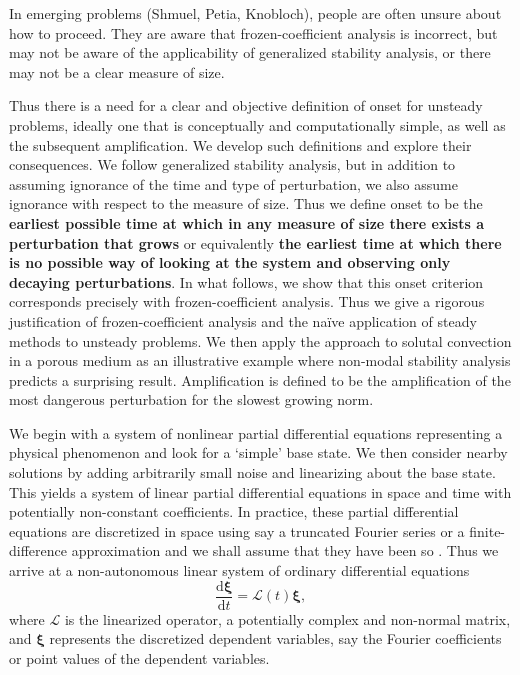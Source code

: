 \documentclass[letterpaper,prl,aps,twocolumn,reprint,superscriptaddress]{revtex4-1}
\newcommand{\cL}{\boldsymbol{\mathcal{L}}}
\newcommand{\prt}{\boldsymbol{\xi}}
\begin{document}
In emerging problems (Shmuel, Petia, Knobloch), people are often unsure about how to proceed.  They are aware that frozen-coefficient analysis is incorrect, but may not be aware of the applicability of generalized stability analysis, or there may not be a clear measure of size.

Thus there is a need for a clear and objective definition of onset for unsteady problems, ideally one that is conceptually and computationally simple, as well as the subsequent amplification.  We develop such definitions and explore their consequences.  We follow generalized stability analysis, but in addition to assuming ignorance of the time and type of perturbation, we also assume ignorance with respect to the measure of size.  Thus we define onset to be the {\bf earliest possible time at which in any measure of size there exists a perturbation that grows} or equivalently {\bf the earliest time at which there is no possible way of looking at the system and observing only decaying perturbations}.  In what follows, we show that this onset criterion corresponds precisely with frozen-coefficient analysis.  Thus we give a rigorous justification of frozen-coefficient analysis and the na\"ive application of steady methods to unsteady problems.  We then apply the approach to solutal convection in a porous medium as an illustrative example where non-modal stability analysis predicts a surprising result.  Amplification is defined to be the amplification of the most dangerous perturbation for the slowest growing norm.

We begin with a system of nonlinear partial differential equations representing a physical phenomenon and look for a `simple' base state.  We then consider nearby solutions by adding arbitrarily small noise and linearizing about the base state.  This yields a system of linear partial differential equations in space and time with potentially non-constant coefficients.  In practice, these partial differential equations are discretized in space using say a truncated Fourier series or a finite-difference approximation and we shall assume that they have been so \cite{FarrellIoannou}.  Thus we arrive at a non-autonomous linear system of ordinary differential equations
\begin{equation} \label{eq:GE}
\frac{\text{d}\prt}{\text{d} t} = \cL(t)\prt,
\end{equation}
where $\cL$ is the linearized operator, a potentially complex and non-normal matrix, and $\prt$ represents the discretized dependent variables, say the Fourier coefficients or point values of the dependent variables.  
\end{document}

